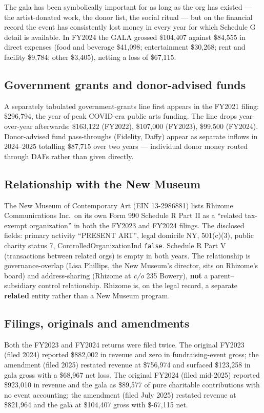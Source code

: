 \documentclass[10pt,letterpaper,twocolumn]{article}
\begin{document}
The gala has been symbolically important for as long as the org has existed --- the artist-donated work, the donor list, the social ritual --- but on the financial record the event has consistently lost money in every year for which Schedule G detail is available. In FY2024 the GALA grossed \$104,407 against \$84,555 in direct expenses (food and beverage \$41,098; entertainment \$30,268; rent and facility \$9,784; other \$3,405), netting a loss of \$67,115.

\subsection{Government grants and donor-advised funds}

A separately tabulated government-grants line first appears in the FY2021 filing: \$296,794, the year of peak COVID-era public arts funding. The line drops year-over-year afterwards: \$163,122 (FY2022), \$107,000 (FY2023), \$99,500 (FY2024). Donor-advised fund pass-throughs (Fidelity, Daffy) appear as separate inflows in 2024--2025 totalling \$87,715 over two years --- individual donor money routed through DAFs rather than given directly.

\subsection{Relationship with the New Museum}

The New Museum of Contemporary Art (EIN 13-2986881) lists Rhizome Communications Inc.~on its own Form 990 Schedule R Part II as a ``related tax-exempt organization'' in both the FY2023 and FY2024 filings. The disclosed fields: primary activity ``PRESENT ART'', legal domicile NY, 501(c)(3), public charity status 7, ControlledOrganizationInd \texttt{false}. Schedule R Part V (transactions between related orgs) is empty in both years. The relationship is governance-overlap (Lisa Phillips, the New Museum's director, sits on Rhizome's board) and address-sharing (Rhizome at \emph{c/o} 235 Bowery), \textbf{not} a parent--subsidiary control relationship. Rhizome is, on the legal record, a separate \textbf{related} entity rather than a New Museum program.

\subsection{Filings, originals and amendments}

Both the FY2023 and FY2024 returns were filed twice. The original FY2023 (filed 2024) reported \$882,002 in revenue and zero in fundraising-event gross; the amendment (filed 2025) restated revenue at \$756,974 and surfaced \$123,258 in gala gross with a \$68,967 net loss. The original FY2024 (filed mid-2025) reported \$923,010 in revenue and the gala as \$89,577 of pure charitable contributions with no event accounting; the amendment (filed July 2025) restated revenue at \$821,964 and the gala at \$104,407 gross with \$-67,115 net.
\end{document}
